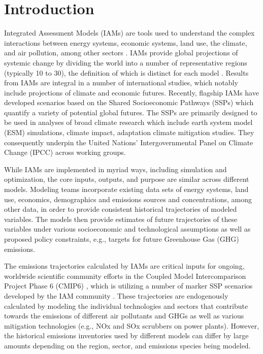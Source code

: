 \section{Introduction}

Integrated Assessment Models (IAMs) are tools used to understand the complex
interactions between energy systems, economic systems, land use, the climate,
and air pollution, among other sectors . IAMs provide global projections of
systemic change by dividing the world into a number of representative regions
(typically 10 to 30), the definition of which is distinct for each model
\cite{krey_global_2014}. Results from IAMs are integral in a number of
international studies, which notably include projections of climate and economic
futures. Recently, flagship IAMs have developed scenarios based on the Shared
Socioeconomic Pathways (SSPs) \cite{van_vuuren_energy_2017, fricko_marker_2017,
  fujimori_ssp3:_2017, calvin_ssp4:_2017, kriegler_fossil-fueled_2017} which
quantify a variety of potential global futures. The SSPs are primarily designed
to be used in analyses of broad climate research which include earth system
model (ESM) simulations, climate impact, adaptation climate mitigation
studies. They consequently underpin the United Nations' Intergovernmental Panel
on Climate Change (IPCC) across working groups.

While IAMs are implemented in myriad ways, including simulation and
optimization, the core inputs, outputs, and purpose are similar across different
models. Modeling teams incorporate existing data sets of energy systems, land
use, economics, demographics and emissions sources and concentrations, among other
data, in order to provide consistent historical trajectories of modeled
variables. The models then provide estimates of future trajectories of these
variables under various socioeconomic and technological assumptions as well as
proposed policy constraints, e.g., targets for future Greenhouse Gas (GHG)
emissions.

The emissions trajectories calculated by IAMs are critical inputs for ongoing,
worldwide scientific community efforts in the Coupled Model Intercomparison
Project Phase 6 (CMIP6) \cite{eyring_overview_2016}, which is utilizing a number
of marker SSP scenarios developed by the IAM community
\cite{oneill_scenario_2016}. These trajectories are endogenously calculated by
modeling the individual technologies and sectors that contribute towards the
emissions of different air pollutants and GHGs as well as various mitigation
technologies (e.g., NOx and SOx scrubbers on power plants). However, the
historical emissions inventories used by different models can differ by large
amounts depending on the region, sector, and emissions species being modeled.

